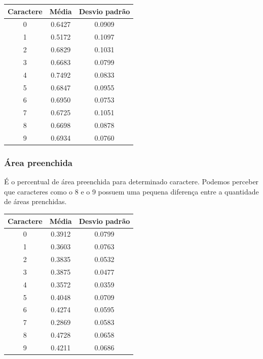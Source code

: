 \documentclass[letterpaper, 10 pt, conference]{ieeeconf}  %
\begin{document}
\begin{table}[h]
\centering
\begin{tabular}{|c|c|c|}
\hline
Caractere & Média  & Desvio padrão \\ \hline
0         & 0.6427 & 0.0909        \\ \hline
1         & 0.5172 & 0.1097        \\ \hline
2         & 0.6829 & 0.1031        \\ \hline
3         & 0.6683 & 0.0799        \\ \hline
4         & 0.7492 & 0.0833        \\ \hline
5         & 0.6847 & 0.0955        \\ \hline
6         & 0.6950 & 0.0753        \\ \hline
7         & 0.6725 & 0.1051        \\ \hline
8         & 0.6698 & 0.0878        \\ \hline
9         & 0.6934 & 0.0760        \\ \hline
\end{tabular}
\end{table}




\subsubsection{Área preenchida}
É o percentual de área preenchida para determinado caractere. Podemos perceber
que caracteres como o 8 e o 9 possuem uma pequena diferença entre a quantidade
de áreas prenchidas.


\begin{table}[h]
\centering
\begin{tabular}{|c|c|c|}
\hline
Caractere & Média  & Desvio padrão \\ \hline
0         & 0.3912 & 0.0799        \\ \hline
1         & 0.3603 & 0.0763        \\ \hline
2         & 0.3835 & 0.0532        \\ \hline
3         & 0.3875 & 0.0477        \\ \hline
4         & 0.3572 & 0.0359        \\ \hline
5         & 0.4048 & 0.0709        \\ \hline
6         & 0.4274 & 0.0595        \\ \hline
7         & 0.2869 & 0.0583        \\ \hline
8         & 0.4728 & 0.0658        \\ \hline
9         & 0.4211 & 0.0686        \\ \hline
\end{tabular}
\end{table}
\end{document}
